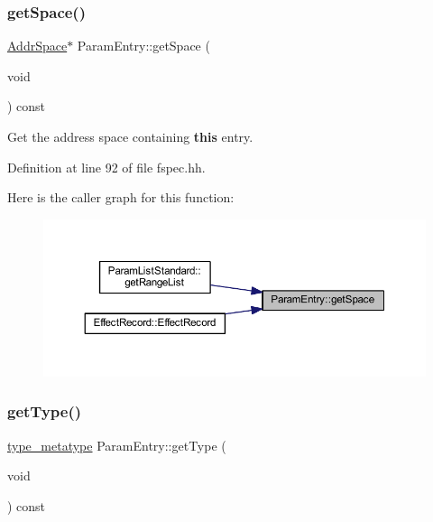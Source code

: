 \subsubsection{\texorpdfstring{getSpace()}{getSpace()}}
{\footnotesize\ttfamily \mbox{\hyperlink{class_addr_space}{Addr\+Space}}$\ast$ Param\+Entry\+::get\+Space (\begin{DoxyParamCaption}\item[{void}]{ }\end{DoxyParamCaption}) const\hspace{0.3cm}{\ttfamily [inline]}}



Get the address space containing {\bfseries{this}} entry. 



Definition at line 92 of file fspec.\+hh.

Here is the caller graph for this function\+:
\nopagebreak
\begin{figure}[H]
\begin{center}
\leavevmode
\includegraphics[width=350pt]{class_param_entry_a498cd78bbe7fa439beeaf8243eed9177_icgraph}
\end{center}
\end{figure}
\mbox{\label{class_param_entry_aeb33e71b09562418a0a2a88650d6403a}} 
\subsubsection{\texorpdfstring{getType()}{getType()}}
{\footnotesize\ttfamily \mbox{\hyperlink{type_8hh_aef6429f2523cdf4d415ba04a0209e61f}{type\+\_\+metatype}} Param\+Entry\+::get\+Type (\begin{DoxyParamCaption}\item[{void}]{ }\end{DoxyParamCaption}) const\hspace{0.3cm}{\ttfamily [inline]}}



